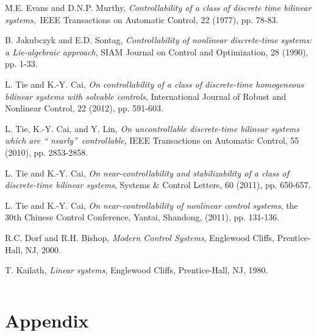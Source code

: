 \documentclass[journal,a4paper,12pt,onecolumn]{IEEEtran}
\begin{document}
\begin{thebibliography}{99}
\bibitem{} M.E. Evans and D.N.P. Murthy, \textit{Controllability of a class
of discrete time bilinear systems},\ IEEE Transactions on Automatic Control,
22 (1977), pp. 78-83.

\bibitem{} B. Jakubczyk and E.D. Sontag, \textit{Controllability of
nonlinear discrete-time systems: a Lie-algebraic approach}, SIAM Journal on
Control and Optimization, 28 (1990), pp. 1-33.

\bibitem{} L. Tie and K.-Y. Cai, \textit{On controllability of a class of
discrete-time homogeneous bilinear systems with solvable controls},
International Journal of Robust and Nonlinear Control, 22 (2012), pp.
591-603.

\bibitem{} L. Tie, K.-Y. Cai, and Y. Lin, \textit{On uncontrollable
discrete-time bilinear systems which are \textquotedblleft
nearly\textquotedblright\ controllable}, IEEE Transactions on Automatic
Control, 55 (2010), pp. 2853-2858.

\bibitem{} L. Tie and K.-Y. Cai, \textit{On near-controllability and
stabilizability of a class of discrete-time bilinear systems}, Systems \&
Control Letters, 60 (2011), pp. 650-657.

\bibitem{} L. Tie and K.-Y. Cai, \textit{On near-controllability of
nonlinear control systems}, the 30th Chinese Control Conference, Yantai,
Shandong, (2011), pp. 131-136.

\bibitem{} R.C. Dorf and R.H. Bishop, \textit{Modern Control Systems},
Englewood Cliffs, Prentice-Hall, NJ, 2000.

\bibitem{} T. Kailath, \textit{Linear systems}, Englewood Cliffs,
Prentice-Hall, NJ, 1980.
\end{thebibliography}

$\left. {}\right. $

\section{Appendix}

$\left. {}\right. $
\end{document}
